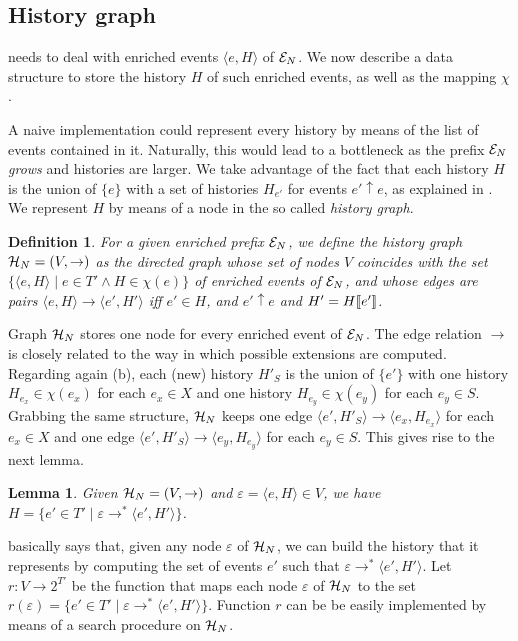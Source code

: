 \documentclass[11pt,a4paper]{article}
\newtheorem{definition}[theorem]{Definition}
\newtheorem{lemma}[theorem]{Lemma}
\begin{document}
\subsection{History graph}
\label{sec:history.graph}

 needs to deal with enriched events $\langle e, H
\rangle$ of $\mathcal{E}_{N}$.  We now describe a data structure to store the history
$H$ of such enriched events, as well as the mapping $\chi$.

A naive implementation could represent every history by means of the list of
events contained in it.  Naturally, this would lead to a bottleneck as the
prefix $\mathcal{E}_{N}$ \textit{grows} and histories are larger.  We take advantage of
the fact that each history $H$ is the union of $\{e\}$ with a set of histories
$H_{e'}$ for events $e' \uparrow e$, as explained in
.  We represent $H$ by means of a node in the so
called \emph{history graph}.

\begin{definition}
For a given enriched prefix $\mathcal{E}_{N}$, we define the \emph{history graph} $\mathcal{H}_{N} = (V, \to)$ as the directed graph whose set of nodes $V$ coincides with the
set $\{\langle e, H \rangle \mid e \in T' \land H \in \chi (e)\}$ of enriched
events of $\mathcal{E}_{N}$, and whose edges are pairs $\langle e, H \rangle \to \langle
e', H' \rangle$ iff $e' \in H$, and $e' \uparrow e$ and $H' = H [\![ e']\!]$.
\end{definition}

Graph $\mathcal{H}_{N}$ stores one node for every enriched event of $\mathcal{E}_{N}$.  The edge
relation $\to$ is closely related to the way in which possible extensions are
computed.  Regarding again  (b), each (new) history
$H'_S$ is the union of $\{e'\}$ with one history $H_{e_x} \in \chi (e_x)$ for
each $e_x \in X$ and one history $H_{e_y} \in \chi (e_y)$ for each $e_y \in S$.
Grabbing the same structure, $\mathcal{H}_{N}$ keeps one edge $\langle e', H'_S \rangle
\to \langle e_x, H_{e_x} \rangle$ for each $e_x \in X$ and one edge $\langle
e', H'_S \rangle \to \langle e_y, H_{e_y} \rangle$ for each $e_y \in S$.  This
gives rise to the next lemma.

\begin{lemma}
\label{lem:given.hst}
Given $\mathcal{H}_{N} = (V, \to)$ and $\varepsilon = \langle e, H \rangle \in V$, we
have $H = \{e' \in T' \mid \varepsilon \to^* \langle e', H' \rangle\}$.
\end{lemma}

 basically says that, given any node $\varepsilon$ of $\mathcal{H}_{N}$,
we can build the history that it represents by computing the set of events $e'$
such that $\varepsilon \to^* \langle e', H' \rangle$.  Let $r \colon V \to
2^{T'}$ be the function that maps each node $\varepsilon$ of $\mathcal{H}_{N}$ to the
set $r (\varepsilon) = \{e' \in T' \mid \varepsilon \to^* \langle e', H'
\rangle\}$.  Function $r$ can be be easily implemented by means of a search
procedure on $\mathcal{H}_{N}$.
\end{document}
